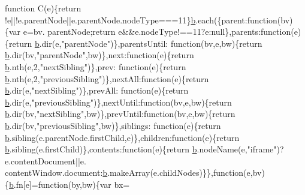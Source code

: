 \begin{DoxyCode}
{      function} C(e)\{\textcolor{keywordflow}{return} !e||!e.parentNode||e.parentNode.nodeType===11\}\hyperlink{jquery_8js_aa4026ad5544b958e54ce5e106fa1c805}{b}.each(\{parent:\textcolor{keyword}{function}(bv)\{var e=bv.
      parentNode;\textcolor{keywordflow}{return} e&&e.nodeType!==11?e:null\},parents:\textcolor{keyword}{function}(e)\{\textcolor{keywordflow}{return} \hyperlink{jquery_8js_aa4026ad5544b958e54ce5e106fa1c805}{b}.dir(e,\textcolor{stringliteral}{"parentNode"})\},parentsUntil:\textcolor{keyword}{
      function}(bv,e,bw)\{\textcolor{keywordflow}{return} \hyperlink{jquery_8js_aa4026ad5544b958e54ce5e106fa1c805}{b}.dir(bv,\textcolor{stringliteral}{"parentNode"},bw)\},next:\textcolor{keyword}{function}(e)\{\textcolor{keywordflow}{return} \hyperlink{jquery_8js_aa4026ad5544b958e54ce5e106fa1c805}{b}.nth(e,2,\textcolor{stringliteral}{"nextSibling"})\},prev:\textcolor{keyword}{
      function}(e)\{\textcolor{keywordflow}{return} \hyperlink{jquery_8js_aa4026ad5544b958e54ce5e106fa1c805}{b}.nth(e,2,\textcolor{stringliteral}{"previousSibling"})\},nextAll:\textcolor{keyword}{function}(e)\{\textcolor{keywordflow}{return} \hyperlink{jquery_8js_aa4026ad5544b958e54ce5e106fa1c805}{b}.dir(e,\textcolor{stringliteral}{"nextSibling"})\},prevAll:\textcolor{keyword}{
      function}(e)\{\textcolor{keywordflow}{return} \hyperlink{jquery_8js_aa4026ad5544b958e54ce5e106fa1c805}{b}.dir(e,\textcolor{stringliteral}{"previousSibling"})\},nextUntil:\textcolor{keyword}{function}(bv,e,bw)\{\textcolor{keywordflow}{return} 
      \hyperlink{jquery_8js_aa4026ad5544b958e54ce5e106fa1c805}{b}.dir(bv,\textcolor{stringliteral}{"nextSibling"},bw)\},prevUntil:\textcolor{keyword}{function}(bv,e,bw)\{\textcolor{keywordflow}{return} \hyperlink{jquery_8js_aa4026ad5544b958e54ce5e106fa1c805}{b}.dir(bv,\textcolor{stringliteral}{"previousSibling"},bw)\},siblings:\textcolor{keyword}{
      function}(e)\{\textcolor{keywordflow}{return} \hyperlink{jquery_8js_aa4026ad5544b958e54ce5e106fa1c805}{b}.sibling(e.parentNode.firstChild,e)\},children:\textcolor{keyword}{function}(e)\{\textcolor{keywordflow}{return} 
      \hyperlink{jquery_8js_aa4026ad5544b958e54ce5e106fa1c805}{b}.sibling(e.firstChild)\},contents:\textcolor{keyword}{function}(e)\{\textcolor{keywordflow}{return} \hyperlink{jquery_8js_aa4026ad5544b958e54ce5e106fa1c805}{b}.nodeName(e,\textcolor{stringliteral}{"iframe"})?e.contentDocument||e.
      contentWindow.document:\hyperlink{jquery_8js_aa4026ad5544b958e54ce5e106fa1c805}{b}.makeArray(e.childNodes)\}\},\textcolor{keyword}{function}(e,bv)\{\hyperlink{jquery_8js_aa4026ad5544b958e54ce5e106fa1c805}{b}.fn[e]=\textcolor{keyword}{function}(by,bw)\{var bx=

\end{DoxyCode}
